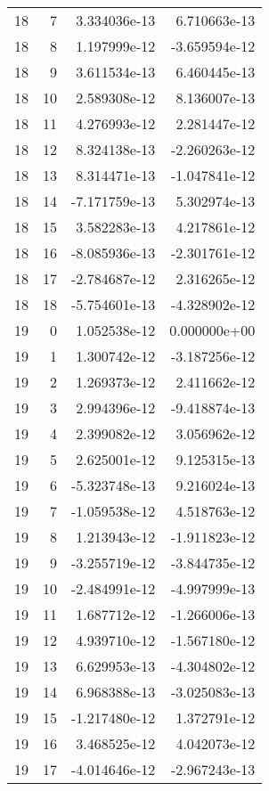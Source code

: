 \begin{tabular}{rrrr}
  18 &    7 &  3.334036e-13 &  6.710663e-13 \\
  18 &    8 &  1.197999e-12 & -3.659594e-12 \\
  18 &    9 &  3.611534e-13 &  6.460445e-13 \\
  18 &   10 &  2.589308e-12 &  8.136007e-13 \\
  18 &   11 &  4.276993e-12 &  2.281447e-12 \\
  18 &   12 &  8.324138e-13 & -2.260263e-12 \\
  18 &   13 &  8.314471e-13 & -1.047841e-12 \\
  18 &   14 & -7.171759e-13 &  5.302974e-13 \\
  18 &   15 &  3.582283e-13 &  4.217861e-12 \\
  18 &   16 & -8.085936e-13 & -2.301761e-12 \\
  18 &   17 & -2.784687e-12 &  2.316265e-12 \\
  18 &   18 & -5.754601e-13 & -4.328902e-12 \\
  19 &    0 &  1.052538e-12 &  0.000000e+00 \\
  19 &    1 &  1.300742e-12 & -3.187256e-12 \\
  19 &    2 &  1.269373e-12 &  2.411662e-12 \\
  19 &    3 &  2.994396e-12 & -9.418874e-13 \\
  19 &    4 &  2.399082e-12 &  3.056962e-12 \\
  19 &    5 &  2.625001e-12 &  9.125315e-13 \\
  19 &    6 & -5.323748e-13 &  9.216024e-13 \\
  19 &    7 & -1.059538e-12 &  4.518763e-12 \\
  19 &    8 &  1.213943e-12 & -1.911823e-12 \\
  19 &    9 & -3.255719e-12 & -3.844735e-12 \\
  19 &   10 & -2.484991e-12 & -4.997999e-13 \\
  19 &   11 &  1.687712e-12 & -1.266006e-13 \\
  19 &   12 &  4.939710e-12 & -1.567180e-12 \\
  19 &   13 &  6.629953e-13 & -4.304802e-12 \\
  19 &   14 &  6.968388e-13 & -3.025083e-13 \\
  19 &   15 & -1.217480e-12 &  1.372791e-12 \\
  19 &   16 &  3.468525e-12 &  4.042073e-12 \\
  19 &   17 & -4.014646e-12 & -2.967243e-13 \\

\end{tabular}
